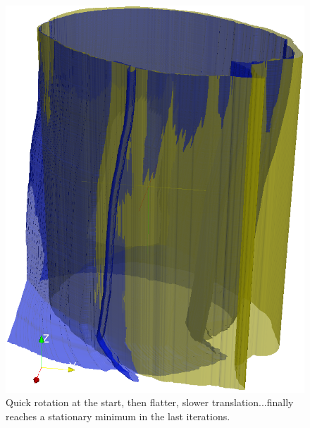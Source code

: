       \begin{figure}[htbp]
        \centering
        \includegraphics[width=\pagewidth]{Ch6/Figs/diagnostics/0562_contour.png}
        \caption{Quick rotation at the start, then flatter, slower translation...finally reaches a stationary minimum in the last iterations.}
        \label{fig:progress_contour}
      \end{figure}
      
